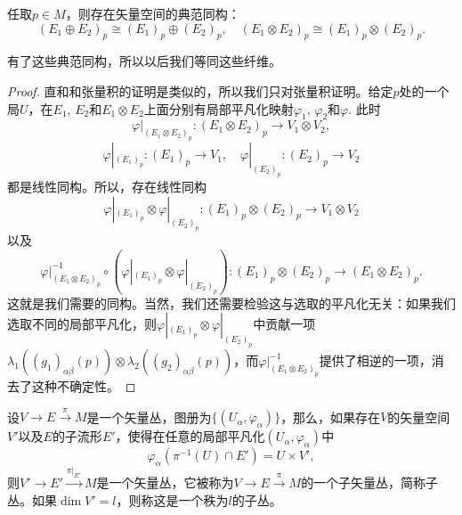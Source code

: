 \begin{pro}
任取$p\in M$，则存在矢量空间的典范同构：
\[
	(E_1\oplus E_2)_p\cong (E_1)_p\oplus (E_2)_p,\quad (E_1\otimes E_2)_p\cong (E_1)_p\otimes (E_2)_p.
\]
\end{pro}

有了这些典范同构，所以以后我们等同这些纤维。

\begin{proof}
直和和张量积的证明是类似的，所以我们只对张量积证明。给定$p$处的一个局$U$，在$E_1$, $E_2$和$E_1\otimes E_2$上面分别有局部平凡化映射$\varphi_1$, $\varphi_2$和$\varphi$. 此时
\[
	\varphi|_{(E_1\otimes E_2)_p}:(E_1\otimes E_2)_p\to V_1\otimes V_2,
\]
\[
	\varphi|_{(E_1)_p}:(E_1)_p\to V_1,\quad \varphi|_{(E_2)_p}:(E_2)_p\to V_2
\]
都是线性同构。所以，存在线性同构
\[
	\varphi|_{(E_1)_p}\otimes \varphi|_{(E_2)_p}:(E_1)_p\otimes (E_2)_p\to V_1\otimes V_2
\]
以及
\[
	\varphi|_{(E_1\otimes E_2)_p}^{-1}\circ \left(\varphi|_{(E_1)_p}\otimes \varphi|_{(E_2)_p}\right):(E_1)_p\otimes (E_2)_p\to (E_1\otimes E_2)_p.
\]
这就是我们需要的同构。当然，我们还需要检验这与选取的平凡化无关：如果我们选取不同的局部平凡化，则$\varphi|_{(E_1)_p}\otimes \varphi|_{(E_2)_p}$中贡献一项$\lambda_1((g_1)_{\alpha\beta}(p))\otimes \lambda_2((g_2)_{\alpha\beta}(p))$，而$\varphi|_{(E_1\otimes E_2)_p}^{-1}$提供了相逆的一项，消去了这种不确定性。
\end{proof}



\begin{para}[矢量丛的子丛]
设$V\to E\xrightarrow{\pi} M$是一个矢量丛，图册为$\{(U_\alpha,\varphi_\alpha)\}$，那么，如果存在$V$的矢量空间$V'$以及$E$的子流形$E'$，使得在任意的局部平凡化$(U_\alpha,\varphi_\alpha)$中
\[
	\varphi_\alpha(\pi^{-1}(U)\cap E')=U\times V',
\]
则$V'\to E'\xrightarrow{\pi|_{E'}}M$是一个矢量丛，它被称为$V\to E\xrightarrow{\pi} M$的一个子矢量丛，简称子丛。如果$\dim V'=l$，则称这是一个秩为$l$的子丛。
\end{para}

